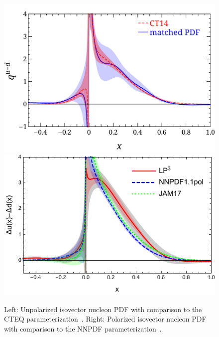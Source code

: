\begin{figure}[h!]
	\centering
	\includegraphics[width=0.95\columnwidth]{figures/LP3-PDF-CT14}\hspace{1cm}
	\includegraphics[width=0.95\columnwidth]{figures/a09m130-helicity-comp}
	\caption{Left: Unpolarized isovector nucleon PDF with comparison to the CTEQ parameterization~\cite{Chen:2018xof}.
		Right: Polarized isovector nucleon PDF with comparison to the NNPDF parameterization~\cite{Lin:2018qky}.}
	\label{fig_quasipdf}
\end{figure}


